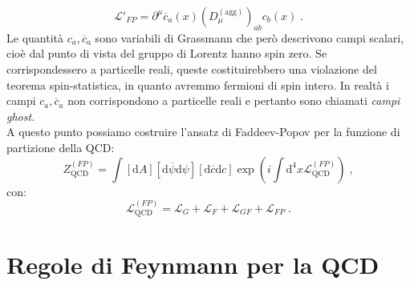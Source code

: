 \documentclass[12pt,a4paper]{article}
\theoremstyle{definition}
\newcommand{\lag}{\mathcal{L}}
\newcommand{\diff}[1][]{\mathrm{d}#1}
\numberwithin{equation}{section}
\begin{document}
\begin{equation}
\lag'_{FP}=\partial^{\mu}\overline{c}_a(x)\left(D_{\mu}^{(\mathrm{agg})}\right)_{ab}c_b(x)\;.
\end{equation}
Le quantità $c_a,\overline{c}_a$ sono variabili di Grassmann che però descrivono campi scalari, cioè dal punto di vista del gruppo di Lorentz hanno spin zero. Se corrispondessero a particelle reali, queste costituirebbero una violazione del teorema spin-statistica, in quanto avremmo fermioni di spin intero. In realtà i campi $c_a,\overline{c}_a$ non corrispondono a particelle reali e pertanto sono chiamati \emph{campi ghost}.\\
A questo punto possiamo costruire l'ansatz di Faddeev-Popov per la funzione di partizione della QCD:
\begin{equation}
\boxed{
Z_{\mathrm{QCD}}^{(FP)}=\int[\diff{A}][\diff{\overline{\psi}}\diff{\psi}][\diff{\overline{c}}\diff{c}]\exp\left(i\int\diff^4{x}\lag_{\mathrm{QCD}}^{(FP)}\right)
}\;,
\end{equation}
con:
\begin{equation}
\lag_{\mathrm{QCD}}^{(FP)}=\lag_G+\lag_F+\lag_{GF}+\lag_{FP}\;.
\end{equation}
\cleardoublepage
\section{Regole di Feynmann per la QCD}
\end{document}
